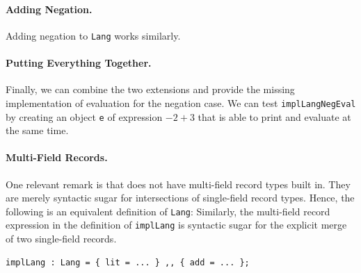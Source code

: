 \paragraph{Adding Negation.}
Adding negation to \lstinline{Lang} works similarly.



\paragraph{Putting Everything Together.}
Finally, we can combine the two extensions and provide the missing
implementation of evaluation for the negation case.
We can test \lstinline{implLangNegEval} by creating an object \lstinline{e} of expression $-2 + 3$ that is able to print and evaluate at the same time.



\paragraph{Multi-Field Records.} One relevant remark is that
\namee does not have multi-field record types built in. They are merely syntactic
sugar for intersections of single-field record types. Hence, the following is an
equivalent definition of \lstinline{Lang}:
Similarly, the multi-field record expression in the definition of
\lstinline{implLang} is syntactic sugar for the explicit merge of two
single-field records.
\begin{lstlisting}
implLang : Lang = { lit = ... } ,, { add = ... };
\end{lstlisting}

